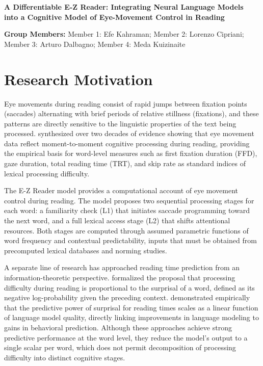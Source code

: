 \documentclass[12pt]{article}
\begin{document}
\newpage

\setcounter{page}{1}
\pagestyle{fancy}

\begin{center}
  \textbf{A Differentiable E-Z Reader: Integrating Neural Language Models\\
  into a Cognitive Model of Eye-Movement Control in Reading}
\end{center}

\vspace{6pt}
\noindent\textbf{Group Members:}\;
Member 1: Efe Kahraman;
Member 2: Lorenzo Cipriani;
Member 3: Arturo Dalbagno;
Member 4: Meda Kuizinaite{\hspace{2.2cm}}

\vspace{12pt}

\section{Research Motivation}

Eye movements during reading consist of rapid jumps between fixation points
(saccades) alternating with brief periods of relative stillness (fixations),
and these patterns are directly sensitive to the linguistic properties of the
text being processed. \citet{rayner1998eye} synthesized over two decades of
evidence showing that eye movement data reflect moment-to-moment cognitive
processing during reading, providing the empirical basis for word-level
measures such as first fixation duration (FFD), gaze duration, total reading
time (TRT), and skip rate as standard indices of lexical processing
difficulty.

The E-Z Reader model \citep{reichle1998toward} provides a computational
account of eye movement control during reading. The model proposes two
sequential processing stages for each word: a familiarity check (L1) that
initiates saccade programming toward the next word, and a full lexical access
stage (L2) that shifts attentional resources. Both stages are computed through
assumed parametric functions of word frequency and contextual predictability,
inputs that must be obtained from precomputed lexical databases and norming
studies.

A separate line of research has approached reading time prediction from an
information-theoretic perspective. \citet{levy2008expectation} formalized the
proposal that processing difficulty during reading is proportional to the
surprisal of a word, defined as its negative log-probability given the
preceding context. \citet{goodkind2018predictive} demonstrated empirically
that the predictive power of surprisal for reading times scales as a linear
function of language model quality, directly linking improvements in language
modeling to gains in behavioral prediction. Although these approaches achieve
strong predictive performance at the word level, they reduce the model's output
to a single scalar per word, which does not permit decomposition of processing
difficulty into distinct cognitive stages.
\end{document}
